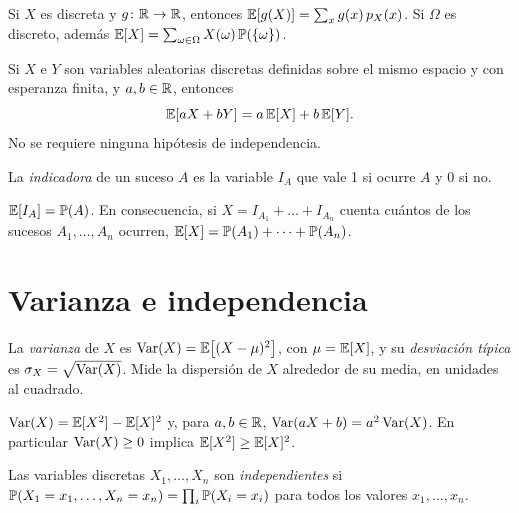 \begin{proposicion}\label{prop:t5-lotus}
Si $X$ es discreta y $g\colon\mathbb{R}\to\mathbb{R}$, entonces $\mathbb{E}[g(X)]=\sum_xg(x)\,p_X(x)$. Si $\Omega$ es discreto, además $\mathbb{E}[X]=\sum_{\omega\in\Omega}X(\omega)\,\mathbb{P}(\{\omega\})$.
\end{proposicion}

\begin{teorema}\label{teo:t5-linealidad}
Si $X$ e $Y$ son variables aleatorias discretas definidas sobre el mismo espacio y con esperanza finita, y $a,b\in\mathbb{R}$, entonces
\[
\mathbb{E}[aX+bY]=a\,\mathbb{E}[X]+b\,\mathbb{E}[Y].
\]
No se requiere ninguna hipótesis de independencia.
\end{teorema}

\begin{definicion}
La \emph{indicadora} de un suceso $A$ es la variable $I_A$ que vale 1 si ocurre $A$ y 0 si no.
\end{definicion}

\begin{proposicion}\label{prop:t5-puente}
$\mathbb{E}[I_A]=\mathbb{P}(A)$. En consecuencia, si $X=I_{A_1}+\dots+I_{A_n}$ cuenta cuántos de los sucesos $A_1,\dots,A_n$ ocurren, $\mathbb{E}[X]=\mathbb{P}(A_1)+\dots+\mathbb{P}(A_n)$.
\end{proposicion}

\addtocounter{definicion}{1}%

\section{Varianza e independencia}

\begin{definicion}[Varianza]
La \emph{varianza} de $X$ es $\operatorname{Var}(X)=\mathbb{E}\bigl[(X-\mu)^{2}\bigr]$, con $\mu=\mathbb{E}[X]$, y su \emph{desviación típica} es $\sigma_X=\sqrt{\operatorname{Var}(X)}$. Mide la dispersión de $X$ alrededor de su media, en unidades al cuadrado.
\end{definicion}

\begin{proposicion}\label{prop:t5-var}
$\operatorname{Var}(X)=\mathbb{E}[X^{2}]-\mathbb{E}[X]^{2}$ y, para $a,b\in\mathbb{R}$, $\operatorname{Var}(aX+b)=a^{2}\operatorname{Var}(X)$. En particular $\operatorname{Var}(X)\ge0$ implica $\mathbb{E}[X^{2}]\ge\mathbb{E}[X]^{2}$.
\end{proposicion}

\begin{definicion}
Las variables discretas $X_1,\dots,X_n$ son \emph{independientes} si $\mathbb{P}(X_1=x_1,\dots,X_n=x_n)=\prod_i\mathbb{P}(X_i=x_i)$ para todos los valores $x_1,\dots,x_n$.
\end{definicion}

